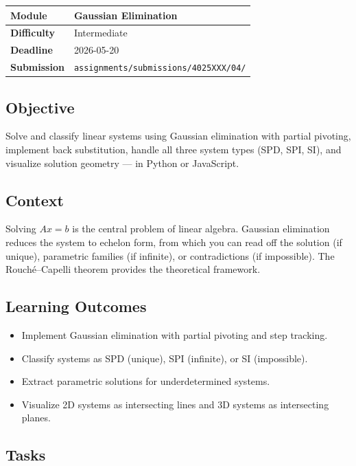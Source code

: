\documentclass[a4paper,11pt]{article}
\newcommand{\assignmentmeta}[4]{%
  \noindent
  \begin{tabularx}{\textwidth}{
    >{\bfseries\color{ippblue}\cellcolor{lightblue}}p{3cm}
    X}
    \arrayrulecolor{gray!40}\hline
    Module     & #1 \\ \hline
    Difficulty & #2 \\ \hline
    Deadline   & #3 \\ \hline
    Submission & \texttt{assignments/submissions/4025XXX/#4/} \\ \hline
  \end{tabularx}
  \vspace{0.8em}
}
\begin{document}
\assignmentmeta{Gaussian Elimination}{Intermediate}{2026-05-20}{04}

\subsection{Objective}

Solve and classify linear systems using Gaussian elimination with partial pivoting, implement back substitution, handle all three system types (SPD, SPI, SI), and visualize solution geometry --- in Python or JavaScript.

\subsection{Context}

Solving $Ax = b$ is the central problem of linear algebra. Gaussian elimination reduces the system to echelon form, from which you can read off the solution (if unique), parametric families (if infinite), or contradictions (if impossible). The Rouch\'e--Capelli theorem provides the theoretical framework.

\subsection{Learning Outcomes}

\begin{itemize}[leftmargin=*]
  \item Implement Gaussian elimination with partial pivoting and step tracking.
  \item Classify systems as SPD (unique), SPI (infinite), or SI (impossible).
  \item Extract parametric solutions for underdetermined systems.
  \item Visualize 2D systems as intersecting lines and 3D systems as intersecting planes.
\end{itemize}

\subsection{Tasks}
\end{document}
